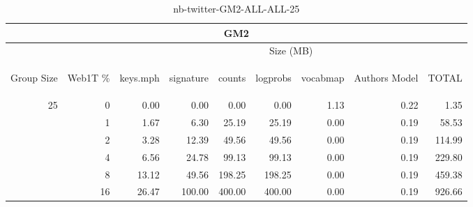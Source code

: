 \begin{center}
\begin{table}[htbp] 
 \begin{center}
\begin{tabular}{ | r | r | r | r | r | r | r | r | r |}
\hline
\multicolumn{9}{|c|}{GM2}\\
\hline
 & & \multicolumn{7}{|c|}{Size (MB)}\\ \cline{3-9}
\begin{sideways}Group Size\end{sideways} & \begin{sideways}Web1T \% \end{sideways} & \begin{sideways}keys.mph\end{sideways} & \begin{sideways}signature\end{sideways} & \begin{sideways}counts\end{sideways} & \begin{sideways}logprobs\end{sideways} & \begin{sideways}vocabmap\end{sideways} & \begin{sideways}Authors Model \end{sideways} & \begin{sideways}TOTAL\end{sideways}\\
\hline
\multirow{5}{*}{25}
 & 0 & 0.00 & 0.00 & 0.00 & 0.00 & 1.13 & 0.22 & 1.35\\ \cline{2-9}
 & 1 & 1.67 & 6.30 & 25.19 & 25.19 & 0.00 & 0.19 & 58.53\\ \cline{2-9}
 & 2 & 3.28 & 12.39 & 49.56 & 49.56 & 0.00 & 0.19 & 114.99\\ \cline{2-9}
 & 4 & 6.56 & 24.78 & 99.13 & 99.13 & 0.00 & 0.19 & 229.80\\ \cline{2-9}
 & 8 & 13.12 & 49.56 & 198.25 & 198.25 & 0.00 & 0.19 & 459.38\\ \cline{2-9}
 & 16 & 26.47 & 100.00 & 400.00 & 400.00 & 0.00 & 0.19 & 926.66\\ \cline{2-9}
\hline
\end{tabular}
\caption{nb-twitter-GM2-ALL-ALL-25}
\label{table:nb-twitter-GM2-ALL-ALL-25}
\end{center}
 \end{table}
\end{center}

